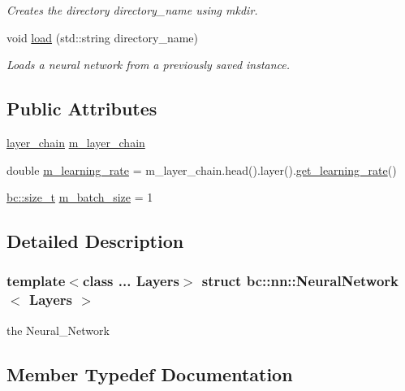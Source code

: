 \begin{DoxyCompactItemize}
\begin{DoxyCompactList}\small\item\em Creates the directory {\ttfamily directory\+\_\+name} using mkdir. \end{DoxyCompactList}\item 
void \hyperlink{structbc_1_1nn_1_1NeuralNetwork_aa397a644190762a4907668244b46297f}{load} (std\+::string directory\+\_\+name)
\begin{DoxyCompactList}\small\item\em Loads a neural network from a previously saved instance. \end{DoxyCompactList}\end{DoxyCompactItemize}
\subsection*{Public Attributes}
\begin{DoxyCompactItemize}
\item 
\hyperlink{structbc_1_1nn_1_1NeuralNetwork_aa313d17911ed2cfaa9355c2f7a9f6846}{layer\+\_\+chain} \hyperlink{structbc_1_1nn_1_1NeuralNetwork_ac53f5c966286089bcf3944374bcabe03}{m\+\_\+layer\+\_\+chain}
\item 
double \hyperlink{structbc_1_1nn_1_1NeuralNetwork_ac2241797a01d34bca13068d9329fd8fe}{m\+\_\+learning\+\_\+rate} = m\+\_\+layer\+\_\+chain.\+head().layer().\hyperlink{structbc_1_1nn_1_1NeuralNetwork_a05de79606c5922a8bf12aa4b2f5a00b9}{get\+\_\+learning\+\_\+rate}()
\item 
\hyperlink{namespacebc_aaf8e3fbf99b04b1b57c4f80c6f55d3c5}{bc\+::size\+\_\+t} \hyperlink{structbc_1_1nn_1_1NeuralNetwork_a134b5b8e3bd6e52f38801022b3ae36a8}{m\+\_\+batch\+\_\+size} = 1
\end{DoxyCompactItemize}


\subsection{Detailed Description}
\subsubsection*{template$<$class ... Layers$>$\newline
struct bc\+::nn\+::\+Neural\+Network$<$ Layers $>$}

the Neural\+\_\+\+Network 



\subsection{Member Typedef Documentation}
\mbox{\label{structbc_1_1nn_1_1NeuralNetwork_a5661d3309e97f88e1fe580a9cc41d867}} 
